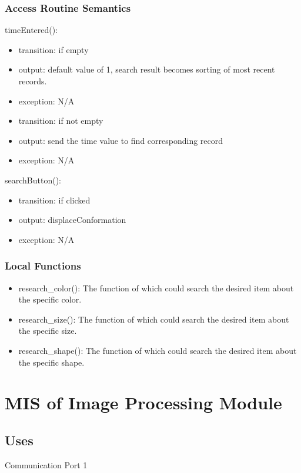 \documentclass[12pt, titlepage]{article}
\begin{document}
\subsubsection{Access Routine Semantics}

\noindent timeEntered():
\begin{itemize}
\item transition: if empty  
\item output: default value of 1, search result becomes sorting of most recent records.
\item exception: N/A
\item transition: if not empty  
\item output: send the time value to find corresponding record
\item exception: N/A
\end{itemize}
\noindent searchButton():
\begin{itemize}
\item transition: if clicked  
\item output: displaceConformation
\item exception: N/A
\end{itemize}



\subsubsection{Local Functions}

\begin{itemize}
\item research\_color(): The function of which could search the desired item about the specific color.
\item research\_size(): The function of which could search the desired item about the specific size.
\item research\_shape(): The function of which could search the desired item about the specific shape.
\end{itemize}
\newpage
\section{MIS of Image Processing Module} 

 

\subsection{Uses}

Communication Port 1
\end{document}
